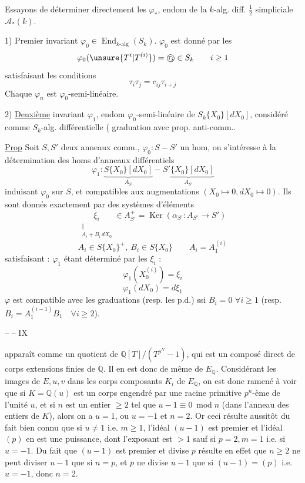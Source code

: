 Essayons de déterminer directement les $\varphi_*$, endom de la $k$-alg. diff. $\frac12$ simpliciale $\mathcal A_*(k)$.

1) Premier invariant $\varphi_0\in\operatorname{End}_{k\text{-alg}}(S_k)$.
 $\varphi_0$ est donné par les
\[
\varphi_0(\unsure{T^i|T^{(i)}})=\text{\textcircled{$\tau_i$}}\in S_k\qquad i\geq1
\]
satisfaisant les conditions
\[
\boxed{\tau_i\tau_j=c_{ij}\tau_{i+j}}
\]
Chaque $\varphi_n$ est $\varphi_0$-semi-linéaire.

2) \uline{Deuxième} invariant $\varphi_1$, endom $\varphi_0$-semi-linéaire de $S_k\{X_0\}[dX_0]$, considéré comme $S_k$-alg. différentielle ( graduation avec prop. anti-comm.\unsure{)}.

\uline{Prop} Soit $S,S'$ deux anneaux comm., $\varphi_0:S-S'$ un hom, on s'intéresse à la détermination des homs d'anneaux différentiels
\[
\varphi_1:\underbrace{S\{X_0\}[dX_0]}_{A_S}-\underbrace{S'\{X_0\}[dX_0]}_{A_{S'}}
\]
induisant $\varphi_0$ sur $S$, et compatibles aux augmentations $(X_0\longmapsto0,dX_0\longmapsto0)$. Ils sont donnés exactement par des systèmes d'éléments
\[
\underset{\substack{\Vert\\A_i+B_i\,dX_0}}{\xi_i}\in A_{S'}^+=\operatorname{Ker}(\alpha_{S'}:A_{S'}\longrightarrow S')
\]
\[
A_i\in S\{X_0\}^+,\ B_i\in S\{X_0\}\qquad A_i=A_1^{(i)}
\]
satisfaisant :
$\varphi_1$ étant déterminé par les $\xi_i$  :
\[
\varphi_1(X_0^{(i)})=\xi_i
\]
\[
\varphi_1(dX_0)=d\xi_1
\]
$\varphi$ est compatible avec les graduations (resp. les p.d.) ssi $B_i=0$ $\forall i\geq1$ (resp. $B_i=A_1^{(i-1)}B_1\quad\forall i\geq2$).

\hfill --  -- \hfill IX

apparaît comme un quotient de $\mathbb Q[T]/(T^{p^N}-1)$, qui est un composé direct de corps extensions finies de $\mathbb Q$. Il en est donc de même de $E_{\mathbb Q}$. Considérant les images de $E,u,v$ dans les corps composants $K_i$ de $E_{\mathbb Q}$, on est donc ramené à voir que si $K=\mathbb Q(u)$ est un corps engendré par une racine primitive $p^n$-ème de l'unité $u$, et si $n$ est un entier $\geq2$ tel que $u-1\equiv0\ \operatorname{mod}n$ (dans l'anneau des entiers de $K$), alors on a $u=1$, ou $u=-1$ et $n=2$. Or ceci résulte aussitôt du fait bien connu que si $u\neq1$ i.e. $m\geq1$, l'idéal $(u-1)$ est premier et l'idéal $(p)$ en est une puissance, dont l'exposant est $>1$ sauf si $p=2,m=1$ i.e. si $u=-1$. Du fait que $(u-1)$ est premier et divise $p$ résulte en effet que $n\geq2$ ne peut diviser $u-1$ que si $n=p$, et $p$ ne divise $u-1$ que si $(u-1)=(p)$ i.e. $u=-1$, donc $n=2$.

